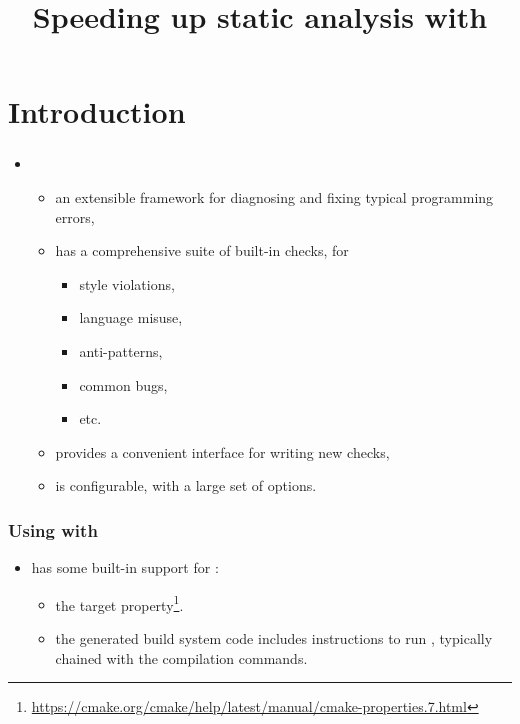\documentclass[compress,table,xcolor=table]{beamer}
\begin{document}
\title{Speeding up static analysis with }
\section{Introduction}
\frame{\titlepage}
\begin{frame}
  \Huge
\end{frame}
\begin{frame}
  \frametitle{}
  \begin{itemize}
      \item{\LARGE{}}
      \begin{itemize}
      \item{an extensible framework for diagnosing and fixing typical
          programming errors,}
      \item{has a comprehensive suite of built-in checks, for}
        \begin{itemize}
        \item{style violations,}
        \item{language misuse,}
        \item{anti-patterns,}
        \item{common bugs,}
        \item{etc.}
        \end{itemize}
      \item{provides a convenient interface for writing new checks,}
      \item{is configurable, with a large set of options.}
      \end{itemize}
  \end{itemize}
\end{frame}
\begin{frame}
    \frametitle{Using  with }
    \LARGE
    \begin{itemize}
    \item {} has some built-in support for :
        \Large
        \begin{itemize}
        \item the  target property\footnote{
                \url{https://cmake.org/cmake/help/latest/manual/cmake-properties.7.html}}.
        \item the generated build system code includes instructions to run
            , typically chained with the compilation
                commands.
        \end{itemize}
    \end{itemize}
\end{frame}
\end{document}

